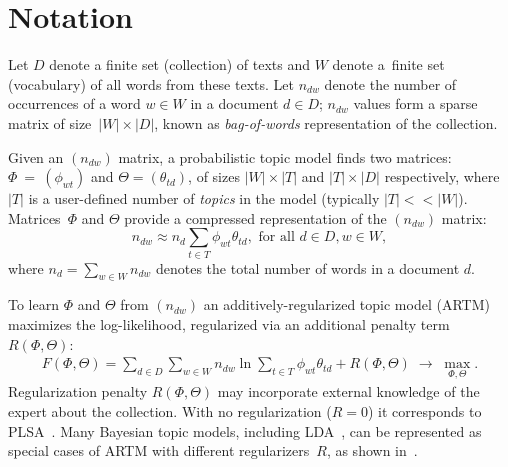 \documentclass[russian,english]{llncs}
\begin{document}

\section{Notation}
\label{sec:Notation}

Let
$D$ denote a finite set (collection) of texts and
$W$ denote a~finite set (vocabulary) of all words from these texts.
Let
$n_{dw}$ denote the number of occurrences of a word $w \in W$ in a document $d \in D$;
$n_{dw}$ values form a sparse matrix of size~$|W| \times |D|$,
known as \emph{bag-of-words} representation of the collection.

Given an $(n_{dw})$ matrix, a probabilistic topic model finds two matrices:
$\Phi~=~(\phi_{wt})$ and $\Theta = (\theta_{td})$,
of sizes $|W| \times |T|$ and $|T| \times |D|$ respectively,
where $|T|$ is a user-defined number of \emph{topics} in the model (typically $|T| << |W|$).
Matrices~$\Phi$ and $\Theta$
provide a compressed representation of the $(n_{dw})$ matrix:
\[
n_{dw} \approx n_d \sum_{t \in T} \phi_{wt} \theta_{td}, \text { for all } d \in D, w \in W,
\]
where $n_d = \sum_{w \in W} n_{dw}$ denotes the total number of words in a document $d$.

To learn $\Phi$ and $\Theta$ from $(n_{dw})$ an additively-regularized topic model (ARTM) maximizes
the log-likelihood, regularized via an additional penalty term $R(\Phi, \Theta)$:
\begin{gather}
\label{eq:ARTM}
    F(\Phi, \Theta) = \sum_{d\in D}\sum_{w\in W} n_{dw} \ln \sum_{t\in T} \phi_{wt} \theta_{td} + R(\Phi, \Theta)
    \;\to\; \max_{\Phi,\Theta}.
\end{gather}
Regularization penalty $R(\Phi, \Theta)$ may incorporate external knowledge
of the expert about the collection.
With no regularization (${R=0}$) it corresponds to PLSA~\cite{hofmann99plsi}.
Many Bayesian topic models, including LDA~\cite{blei03latent}, can be represented
as special cases of ARTM with different regularizers~$R$,
as shown in~\cite{voron15mlj}.
\end{document}
